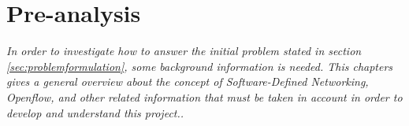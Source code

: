 \chapter{Pre-analysis}
\label{sec:preanalysis}

\textit{In order to investigate how to answer the initial problem stated in section \ref{sec:problemformulation}, some background information is needed. This chapters gives a general overview about the concept of Software-Defined Networking, Openflow, and other related information that must be taken in account in order to develop and understand this project..}


%
%





%
%


